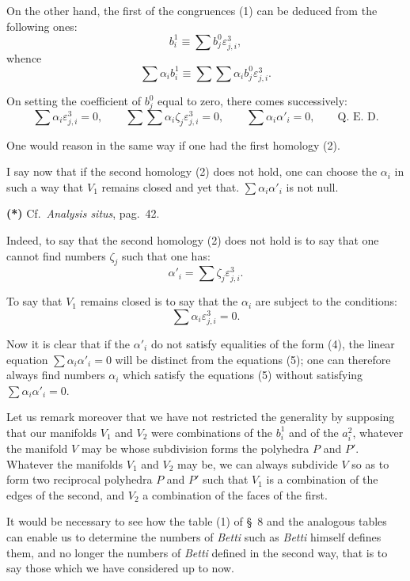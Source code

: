 \documentclass{article}
\begin{document}
On the other hand, the first of the congruences (1) can be deduced from the following ones:
\[ b^{1}_{i} \equiv \sum b^{0}_{j} \varepsilon^{3}_{j,i}, \tag{3} \]
whence
\[ \sum \alpha_{i} b^{1}_{i} \equiv \sum \sum \alpha_{i} b^{0}_{j} \varepsilon^{3}_{j,i}. \]

On setting the coefficient of $b^{0}_{j}$ equal to zero, there comes successively:
\[ \sum \alpha_{i} \varepsilon^{3}_{j,i} = 0, \qquad \sum \sum \alpha_{i} \zeta_{j} \varepsilon^{3}_{j,i} = 0, \qquad \sum \alpha_{i} \alpha'_{i} = 0, \qquad \text{Q.~E.~D.} \]

One would reason in the same way if one had the first homology (2).

I say now that if the second homology (2) does not hold, one can choose the $\alpha_{i}$ in such a way that $V_{1}$ remains closed and yet that. $\displaystyle\sum \alpha_{i} \alpha'_{i}$ is not null.

\textbf{(*)} Cf.\ \emph{Analysis situs}, pag.\ 42.

Indeed, to say that the second homology (2) does not hold is
to say that one cannot find numbers $\zeta_{j}$ such that one has:
\[ \alpha'_{i} = \sum \zeta_{j} \varepsilon^{3}_{j,i}. \tag{4} \]

To say that $V_{1}$ remains closed is to say that the $\alpha_{i}$ are subject to the conditions:
\[ \sum \alpha_{i} \varepsilon^{3}_{j,i} = 0. \tag{5} \]

Now it is clear that if the $\alpha'_{i}$ do not satisfy equalities of the form (4), the linear equation $\displaystyle\sum \alpha_{i} \alpha'_{i} = 0$ will be distinct from the equations (5); one can therefore always find numbers $\alpha_{i}$ which satisfy the equations (5) without satisfying $\displaystyle\sum \alpha_{i} \alpha'_{i} = 0$.

Let us remark moreover that we have not restricted the generality by supposing that our manifolds $V_{1}$ and $V_{2}$ were combinations of the $b^{1}_{i}$ and of the $a^{2}_{i}$, whatever the manifold $V$ may be whose subdivision forms the polyhedra $P$ and $P'$. Whatever the manifolds $V_{1}$ and $V_{2}$ may be, we can always subdivide $V$ so as to form two reciprocal polyhedra $P$ and $P'$ such that $V_{1}$ is a combination of the edges of the second, and $V_{2}$ a combination of the faces of the first.

It would be necessary to see how the table (1) of \S~8 and the analogous tables can enable us to determine the numbers of \emph{Betti} such as \emph{Betti} himself defines them, and no longer the numbers of \emph{Betti} defined in the second way, that is to say those which we have considered up to now.
\end{document}
